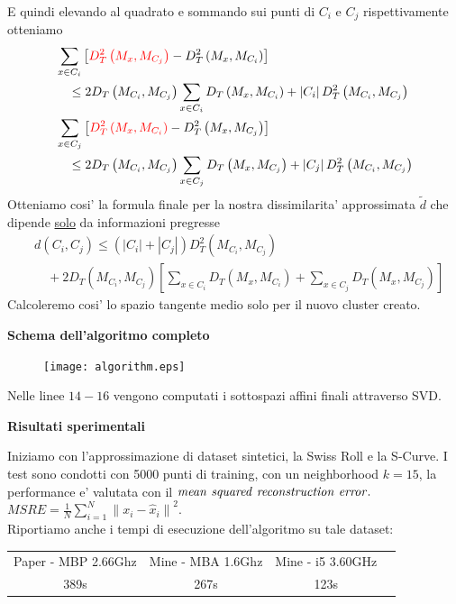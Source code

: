 \documentclass[a4, landscape]{seminar}
\theoremstyle{definition}
\def\bc{\begin{center}}
\def\ec{\end{center}}
\def\bs{\begin{slide}\begingroup\small}
\def\es{\endgroup\end{slide}}
\begin{document}
\bs
E quindi elevando al quadrato e sommando sui punti di $C_i$ e $C_j$ rispettivamente otteniamo
\begin{equation*}
\begin{aligned}
  &\sum_{x \in C_{i}}\left[\textcolor{red}{D_{T}^{2}\left(M_{x}, M_{C_{j}}\right)}-D_{T}^{2}\left(M_{x}, M_{C_{i}}\right)\right] \\
  &\quad \leq 2 D_{T}\left(M_{C_{i}}, M_{C_{j}}\right) \sum_{x \in C_{i}} D_{T}\left(M_{x}, M_{C_{i}}\right)+\left|C_{i}\right| D_{T}^{2}\left(M_{C_{i}}, M_{C_{j}}\right) \\
  &\sum_{x \in C_{j}}\left[\textcolor{red}{D_{T}^{2}\left(M_{x}, M_{C_{i}}\right)}-D_{T}^{2}\left(M_{x}, M_{C_{j}}\right)\right] \\
  &\quad \leq 2 D_{T}\left(M_{C_{i}}, M_{C_{j}}\right) \sum_{x \in C_{j}} D_{T}\left(M_{x}, M_{C_{j}}\right)+\left|C_{j}\right| D_{T}^{2}\left(M_{C_{i}}, M_{C_{j}}\right)
  \end{aligned}
\end{equation*}
Otteniamo cosi' la formula finale per la nostra dissimilarita' approssimata $\tilde{d}$ che dipende \underline{solo}
da informazioni pregresse
\begin{equation*}
  \begin{aligned}
    &d\left(C_{i}, C_{j}\right) \leq\left(\left|C_{i}\right|+\left|C_{j}\right|\right) D_{T}^{2}\left(M_{C_{i}}, M_{C_{j}}\right) \\
    &\quad+2 D_{T}\left(M_{C_{i}}, M_{C_{j}}\right)\left[\sum_{x \in C_{i}} D_{T}\left(M_{x}, M_{C_{i}}\right)+\sum_{x \in C_{j}} D_{T}\left(M_{x}, M_{C_{j}}\right)\right]
  \end{aligned}
\end{equation*}
Calcoleremo cosi' lo spazio tangente medio solo per il nuovo cluster creato.
\es

\bs
\bc{\bf\color{blue}Schema dell'algoritmo completo}\ec
\begin{figure}[b]
\centering
\texttt{[image: algorithm.eps]}
\end{figure}
Nelle linee $14-16$ vengono computati i sottospazi affini finali attraverso SVD.
\es

\bs
\bc{\bf\color{blue}Risultati sperimentali}\ec
Iniziamo con l'approssimazione di dataset sintetici, la Swiss Roll e la S-Curve. I test sono condotti con 5000 punti di training,
con un neighborhood $k=15$, la performance e' valutata con il $\it{mean\ squared\ reconstruction\ error.}$
$M S R E=\frac{1}{N} \sum_{i=1}^{N}\left\|x_{i}-\hat{x}_{i}\right\|^{2}$. \\
Riportiamo anche i tempi di esecuzione dell'algoritmo su tale dataset:
\begin{center}
    \begin{tabular}{ |c|c|c|c| }
    \hline
    Paper - MBP 2.66Ghz & Mine - MBA 1.6Ghz & Mine - i5 3.60GHz \\
    389s & \color[HTML]{009901} 267s & \color[HTML]{009901} 123s \\
    \hline
    \end{tabular}
\end{center}
\es
\end{document}
